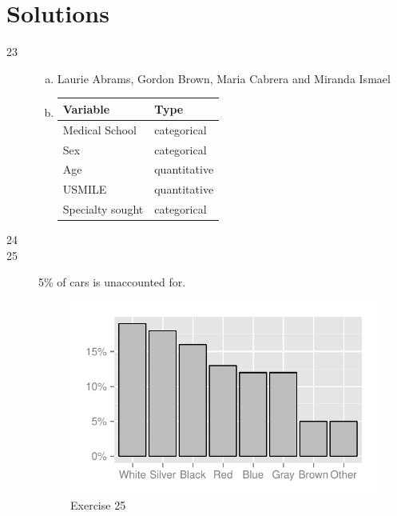 \documentclass[letterpaper, landscape]{exam}
\begin{document}
    \section{Solutions}
    \begin{description}
      \item[23]
        \begin{enumerate}[(a)]
          \item Laurie Abrams, Gordon Brown, Maria Cabrera and Miranda Ismael 

          \item
            \begin{tabular}[H]{ll}
              \toprule
              Variable         & Type \\
              \midrule
              Medical School   & categorical \\
              Sex              & categorical \\
              Age              & quantitative \\
              USMILE           & quantitative \\
              Specialty sought & categorical \\
              \bottomrule
            \end{tabular}
        \end{enumerate}

      \newpage

      \item[24]

      \item[25]
        5\% of cars is unaccounted for.

        \begin{figure}[H]
          \centering
          \includegraphics{figures/ex25.pdf}
          \caption{Exercise 25}
        \end{figure}


\end{description}
\end{document}

